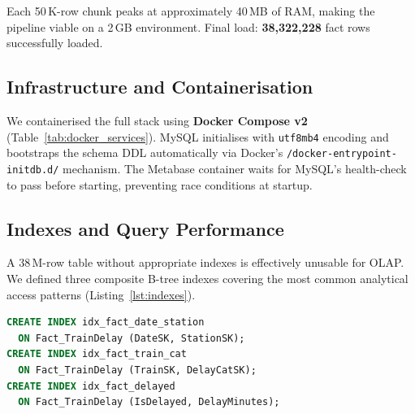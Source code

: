 \documentclass[conference]{IEEEtran}
\begin{document}
Each 50\,K-row chunk peaks at approximately 40\,MB of RAM, making the
pipeline viable on a 2\,GB environment.
Final load: \textbf{38,322,228} fact rows successfully loaded.

\subsection{Infrastructure and Containerisation}

We containerised the full stack using \textbf{Docker Compose v2}
(Table~\ref{tab:docker_services}).
MySQL initialises with \texttt{utf8mb4} encoding and bootstraps the schema
DDL automatically via Docker's \texttt{/docker-entrypoint-initdb.d/}
mechanism.
The Metabase container waits for MySQL's health-check to pass before
starting, preventing race conditions at startup.

\begin{table}[htbp]
  \caption{Docker Compose Services}
  \label{tab:docker_services}
  \begin{center}
  \end{center}
\end{table}

\subsection{Indexes and Query Performance}

A 38\,M-row table without appropriate indexes is effectively unusable for
OLAP.
We defined three composite B-tree indexes covering the most common
analytical access patterns (Listing~\ref{lst:indexes}).

\begin{lstlisting}[language=SQL,
                   caption={Composite indexes on \texttt{Fact\_TrainDelay}},
                   label=lst:indexes]
CREATE INDEX idx_fact_date_station
  ON Fact_TrainDelay (DateSK, StationSK);
CREATE INDEX idx_fact_train_cat
  ON Fact_TrainDelay (TrainSK, DelayCatSK);
CREATE INDEX idx_fact_delayed
  ON Fact_TrainDelay (IsDelayed, DelayMinutes);
\end{lstlisting}
\end{document}
